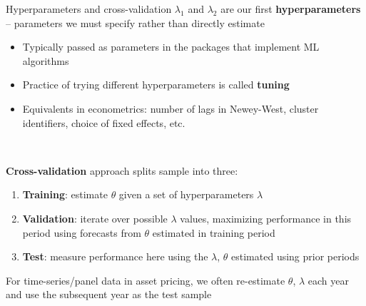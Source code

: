 \documentclass[xcolor=table, aspectratio=169]{beamer}
\newcommand{\alertbf}[1]{\alert{\textbf{#1}}}
\begin{document}
\begin{frame}{Hyperparameters and cross-validation}
$\lambda_1$ and $\lambda_2$ are our first \alertbf{hyperparameters} -- parameters we must specify rather than directly estimate
\begin{itemize}
    \item Typically passed as parameters in the packages that implement ML algorithms
    \item Practice of trying different hyperparameters is called \alertbf{tuning}
    \item Equivalents in econometrics: number of lags in Newey-West, cluster identifiers, choice of fixed effects, etc.
\end{itemize}

~

\alertbf{Cross-validation} approach splits sample into three:
\begin{enumerate}
    \item \alertbf{Training}: estimate $\theta$ given a set of hyperparameters $\lambda$
    \item \alertbf{Validation}: iterate over possible $\lambda$ values, maximizing performance in this period using forecasts from $\theta$ estimated in training period
    \item \alertbf{Test}: measure performance here using the $\lambda$, $\theta$ estimated using prior periods
\end{enumerate}
For time-series/panel data in asset pricing, we often re-estimate $\theta$, $\lambda$ each year and use the subsequent year as the test sample
    
\end{frame}
\end{document}
